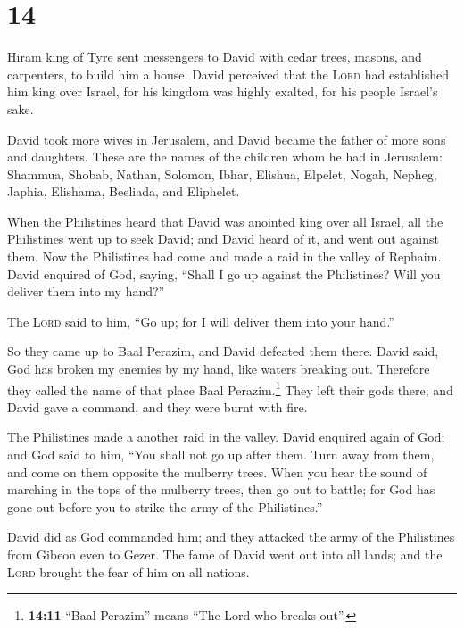 \hypertarget{section-13}{%
\section{14}\label{section-13}}

 Hiram king of Tyre sent messengers to David with cedar
trees, masons, and carpenters, to build him a house. 
David perceived that the \textsc{Lord} had established him king over
Israel, for his kingdom was highly exalted, for his people Israel's
sake.

 David took more wives in Jerusalem, and David became the
father of more sons and daughters.  These are the names of
the children whom he had in Jerusalem: Shammua, Shobab, Nathan, Solomon,
 Ibhar, Elishua, Elpelet,  Nogah, Nepheg,
Japhia,  Elishama, Beeliada, and Eliphelet.

 When the Philistines heard that David was anointed king
over all Israel, all the Philistines went up to seek David; and David
heard of it, and went out against them.  Now the
Philistines had come and made a raid in the valley of Rephaim.
 David enquired of God, saying, ``Shall I go up against
the Philistines? Will you deliver them into my hand?''

The \textsc{Lord} said to him, ``Go up; for I will deliver them into
your hand.''

 So they came up to Baal Perazim, and David defeated them
there. David said, God has broken my enemies by my hand, like waters
breaking out. Therefore they called the name of that place Baal
Perazim.\footnote{\textbf{14:11} ``Baal Perazim'' means ``The Lord who
  breaks out''.}  They left their gods there; and David
gave a command, and they were burnt with fire.

 The Philistines made a another raid in the valley.
 David enquired again of God; and God said to him, ``You
shall not go up after them. Turn away from them, and come on them
opposite the mulberry trees.  When you hear the sound of
marching in the tops of the mulberry trees, then go out to battle; for
God has gone out before you to strike the army of the Philistines.''

 David did as God commanded him; and they attacked the
army of the Philistines from Gibeon even to Gezer.  The
fame of David went out into all lands; and the \textsc{Lord} brought the
fear of him on all nations.

